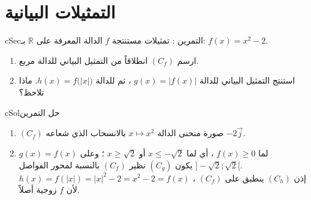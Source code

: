 \documentclass[12pt,a4paper]{article}
\newenvironment{BOX}[2]{\begin{otherlanguage}{english}\begin{arbox}{#1}{#2}}{\end{arbox}\end{otherlanguage}}
\newcounter{exo}
\newenvironment{tamrin}[1]{\stepcounter{exo}\begin{BOX}{cSec}{التمرين \theexo: #1}}{\end{BOX}}
\newenvironment{hal}{\Needspace{12\baselineskip}\begin{otherlanguage}{english}\begin{arbox}[breakable]{cSol}{حل التمرين \theexo}}{\end{arbox}\end{otherlanguage}}
\newenvironment{LTR}{\begin{otherlanguage}{english}}{\end{otherlanguage}}
\newcommand{\R}{\mathbb{R}}
\newcommand{\Grid}[4]{%
 \draw[gray!25] (#1,#3) grid (#2,#4);
 \draw[-{Stealth}] (#1-0.2,0)--(#2+0.3,0) node[below]{$x$};
 \draw[-{Stealth}] (0,#3-0.2)--(0,#4+0.3) node[left]{$y$};
 \node[below left,font=\scriptsize] at (0,0){$O$};}
\begin{document}
\section{التمثيلات البيانية}
\begin{tamrin}{تمثيلات مستنتجة}
$f$ الدالة المعرفة على $\R$ بـ: $f(x)=x^2-2$.
\begin{enumerate}
\item ارسم $(C_f)$ انطلاقاً من التمثيل البياني للدالة مربع.
\item استنتج التمثيل البياني للدالة $g(x)=|f(x)|$ ، ثم للدالة $h(x)=f\big(|x|\big)$. ماذا تلاحظ؟
\end{enumerate}
\end{tamrin}
\begin{hal}
\begin{minipage}{0.55\textwidth}
\begin{enumerate}
\item $(C_f)$ صورة منحنى الدالة $x\mapsto x^2$ بالانسحاب الذي شعاعه $-2\vec j$.
\item $g(x)=f(x)$ لما $f(x)\ge0$ ، أي لما $x\le-\sqrt2$ أو $x\ge\sqrt2$ ؛ وعلى $]-\sqrt2;\sqrt2[$ يكون $(C_g)$ نظير $(C_f)$ بالنسبة لمحور الفواصل.\\[2pt]
$h(x)=f(|x|)=|x|^2-2=x^2-2=f(x)$ ، إذن $(C_h)$ ينطبق على $(C_f)$ لأن $f$ زوجية أصلاً.
\end{enumerate}
\end{minipage}\hfill
\begin{minipage}{0.42\textwidth}
\centering
\begin{LTR}
\end{LTR}
\end{minipage}
\end{hal}
\end{document}
